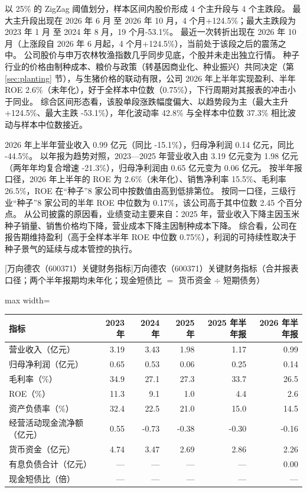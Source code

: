  以 25\% 的 ZigZag 阈值划分，样本区间内股价形成 4 个主升段与 4 个主跌段。 最大主升段出现在 2026 年 6 月 至 2026 年 10 月，4 个月+124.5\%；最大主跌段为 2023 年 1 月 至 2024 年 8 月，19 个月-53.1\%。 最近一次转折出现在 2026 年 10 月（上涨段自 2026 年 6 月起，4 个月+124.5\%），当前处于该段之后的震荡之中。 公司股价与申万农林牧渔指数几乎同步见底，个股并未走出独立行情。 种子行业的价格由制种成本、粮价与政策（转基因商业化、种业振兴）共同决定（第 \ref{sec:planting} 节），与生猪价格的联动有限，公司 2026 年上半年实现盈利、半年 ROE 2.6\%（未年化），好于全样本中位数（0.75\%），下行周期对其报表的冲击小于同业。 综合区间形态看，该股单段涨跌幅度偏大、以趋势段为主（最大主升 +124.5\%、最大主跌 -53.1\%），年化波动率 42.8\% 与全样本中位数 37.3\% 相比波动与样本中位数接近。

 2026 年上半年营业收入 0.99 亿元（同比 -15.1\%），归母净利润 0.14 亿元，同比 -44.5\%。 以年报为趋势对照，2023---2025 年营业收入由 3.19 亿元变为 1.98 亿元（两年年均复合增速 -21.3\%），归母净利润由 0.65 亿元变为 0.06 亿元。 按半年报口径，2026 年上半年的 ROE 为 2.6\%（未年化）、销售净利率 15.5\%、毛利率 26.5\%，ROE 在“种子”8 家公司中按数值由高到低排第位。 按同一口径，三级行业“种子”8 家公司的半年 ROE 中位数为 0.17\%，该公司高于其中位数 2.45 个百分点。 从公司披露的原因看，业绩变动主要来自：2025 年，营业收入下降主因玉米种子销量、销售价格均下降，营业成本下降主因制种成本下降。 综合看，公司在报告期维持盈利（高于全样本半年 ROE 中位数 0.75\%），利润的可持续性取决于种子景气的延续与成本管控的执行。

\begin{center}\small\setlength{\tabcolsep}{3.4pt}
[万向德农（600371）关键财务指标]{万向德农（600371）关键财务指标（合并报表口径；两个半年报期均未年化；现金短债比 $=$ 货币资金 $\div$ 短期债务）}
\begin{adjustbox}{max width=\textwidth}
\begin{tabular}{@{}lrrrrr@{}}
\toprule
指标 & 2023 年 & 2024 年 & 2025 年 & 2025 年半年报 & 2026 年半年报 \\
\midrule
营业收入（亿元） & 3.19 & 3.43 & 1.98 & 1.17 & 0.99 \\
归母净利润（亿元） & 0.65 & 0.53 & 0.06 & 0.25 & 0.14 \\
毛利率（\%） & 34.9 & 27.1 & 27.3 & 33.7 & 26.5 \\
ROE（\%） & 11.3 & 9.1 & 1.0 & 4.4 & 2.6 \\
资产负债率（\%） & 32.4 & 22.5 & 21.0 & 15.0 & 14.5 \\
经营活动现金流净额（亿元） & 0.55 & -0.73 & -0.38 & -0.30 & -0.16 \\
货币资金（亿元） & 4.74 & 3.47 & 2.69 & 2.86 & 2.26 \\
有息负债合计（亿元） & --- & --- & --- & --- & 0.00 \\
现金短债比（倍） & --- & --- & --- & --- & --- \\
\bottomrule
\end{tabular}
\end{adjustbox}
\end{center}

